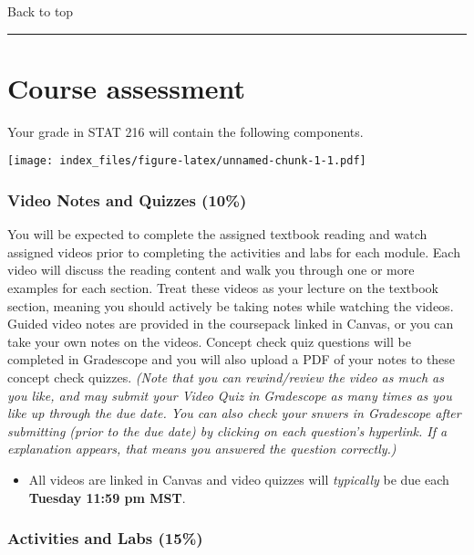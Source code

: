 \documentclass[
]{article}
\providecommand{\tightlist}{%
  \setlength{\itemsep}{0pt}\setlength{\parskip}{0pt}}
\begin{document}
Back to top

\begin{center}\rule{0.5\linewidth}{0.5pt}\end{center}

\section{Course assessment}\label{course-assessment}

Your grade in STAT 216 will contain the following components.

\texttt{[image: index\_files/figure-latex/unnamed-chunk-1-1.pdf]}

\subsubsection{Video Notes and Quizzes
(10\%)}\label{video-notes-and-quizzes-10}

You will be expected to complete the assigned textbook reading and watch
assigned videos prior to completing the activities and labs for each
module. Each video will discuss the reading content and walk you through
one or more examples for each section. Treat these videos as your
lecture on the textbook section, meaning you should actively be taking
notes while watching the videos. Guided video notes are provided in the
coursepack linked in Canvas, or you can take your own notes on the
videos. Concept check quiz questions will be completed in Gradescope and
you will also upload a PDF of your notes to these concept check quizzes.
\emph{(Note that you can rewind/review the video as much as you like,
and may submit your Video Quiz in Gradescope as many times as you like
up through the due date. You can also check your snwers in Gradescope
after submitting (prior to the due date) by clicking on each question's
hyperlink. If a explanation appears, that means you answered the
question correctly.)}

\begin{itemize}
\tightlist
\item
  All videos are linked in Canvas and video quizzes will
  \emph{typically} be due each \textbf{Tuesday 11:59 pm MST}.
\end{itemize}

\subsubsection{Activities and Labs (15\%)}\label{activities-and-labs-15}
\end{document}
